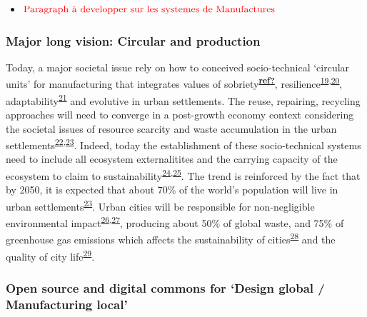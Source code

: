 \documentclass[
  11pt,
  a4paperpaper,
  onecolumn]{article}
\providecommand{\tightlist}{%
  \setlength{\itemsep}{0pt}\setlength{\parskip}{0pt}}\usepackage{longtable,booktabs,array}
\begin{document}
\begin{itemize}
\tightlist
\item
  \(\color{red}{\text{Paragraph à developper sur les systemes de Manufactures}}\)
\end{itemize}

\hypertarget{major-long-vision-circular-and-production}{%
\subsubsection{Major long vision: Circular and
production}\label{major-long-vision-circular-and-production}}

Today, a major societal issue rely on how to conceived socio-technical
`circular units' for manufacturing that integrates values of
sobriety\textsuperscript{\protect\hyperlink{ref-ref}{\textbf{ref?}}},
resilience\textsuperscript{\protect\hyperlink{ref-touriki2021}{19},\protect\hyperlink{ref-VanFan2019}{20}},
adaptability\textsuperscript{\protect\hyperlink{ref-weichhart2021}{21}}
and evolutive in urban settlements. The reuse, repairing, recycling
approaches will need to converge in a post-growth economy context
considering the societal issues of resource scarcity and waste
accumulation in the urban
settlements\textsuperscript{\protect\hyperlink{ref-kallis2018}{22},\protect\hyperlink{ref-savini2021}{23}}.
Indeed, today the establishment of these socio-technical systems need to
include all ecosystem externalitites and the carrying capacity of the
ecosystem to claim to
sustainability\textsuperscript{\protect\hyperlink{ref-Bakshi2018}{24},\protect\hyperlink{ref-Bakshi2019a}{25}}.
The trend is reinforced by the fact that by 2050, it is expected that
about 70\% of the world's population will live in urban
settlements\textsuperscript{\protect\hyperlink{ref-savini2021}{23}}.
Urban cities will be responsible for non-negligible environmental
impact\textsuperscript{\protect\hyperlink{ref-Zheng2020}{26},\protect\hyperlink{ref-Sodiq2019}{27}},
producing about 50\% of global waste, and 75\% of greenhouse gas
emissions which affects the sustainability of
cities\textsuperscript{\protect\hyperlink{ref-schraven2021}{28}} and the
quality of city
life\textsuperscript{\protect\hyperlink{ref-Riffat2016}{29}}.

\hypertarget{open-source-and-digital-commons-for-design-global-manufacturing-local}{%
\subsubsection{Open source and digital commons for `Design global /
Manufacturing
local'}\label{open-source-and-digital-commons-for-design-global-manufacturing-local}}
\end{document}
